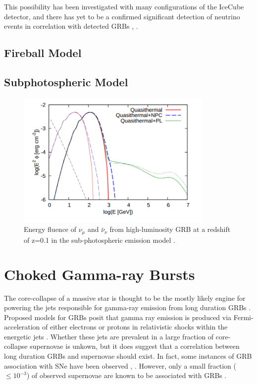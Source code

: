 \documentclass{gatech-thesis}
\begin{document}
This possibility has been investigated with many configurations of the IceCube detector, and there has yet to be a confirmed significant detection of neutrino events in correlation with detected GRBs \cite{2011PhRvL.106n1101A}, \cite{2012Natur.484..351I}.
\subsection{Fireball Model}


\subsection{Subphotospheric Model}

\begin{figure}[ht]
  \begin{center}
    \includegraphics[width=0.85\textwidth,keepaspectratio]{SubPhotoFluence.png}
  \end{center}
  \caption{Energy fluence of $\nu_{\mu}$ and $\bar{\nu}_{\nu}$ from high-luminosity GRB at a redshift of z=0.1 in the sub-photospheric emission model \cite{2013PhRvL.111m1102M}.}
  \label{fig:subphotospheric_nus}
\end{figure}


\section{Choked Gamma-ray Bursts}
The core-collapse of a massive star is thought to be the mostly likely engine for powering the jets responsible for gamma-ray emission from long duration GRBs \cite{2004RvMP...76.1143P}. Proposed models for GRBs posit that gamma ray emission is produced via Fermi-acceleration of either electrons or protons in relativistic shocks within the energetic jets \cite{2004IJMPA..19.2385Z}. Whether these jets are prevalent in a large fraction of core-collapse supernovae is unkown, but it does suggest that a correlation between long duration GRBs and supernovae should exist. In fact, some instances of GRB association with SNe have been observed \cite{2006ARA&A..44..507W}, \cite{2011AN....332..434M} \cite{2003astro.ph..1006H}. However, only a small fraction ($\leq 10^{-3}$) of observed supernovae are known to be associated with GRBs \cite{2003ApJ...599..408B}. 
\end{document}

